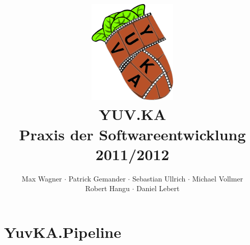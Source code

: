 \documentclass{scrartcl}
\begin{document}
\title{
    \hspace{-0.5cm} \includegraphics[height=5cm]{logo.png} \\[1cm]
    \Huge{YUV.KA} \\ \large{Praxis der Softwareentwicklung 2011/2012}
}
\author{Max Wagner $\cdot$ Patrick Gemander $\cdot$ Sebastian Ullrich $\cdot$ Michael Vollmer \\ Robert Hangu $\cdot$ Daniel Lebert}
\maketitle

\newpage
\mbox{}
\newpage
\mbox{}

\tableofcontents
\newpage
\mbox{}
\newpage
\section{YuvKA.Pipeline}

\end{document}
